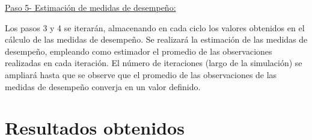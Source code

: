 \documentclass[12pt,letterpaper,spanish]{article}
\begin{document}
\begin{enumerate}
\underline{Paso 5- Estimación de medidas de desempeño:} 

Los pasos 3 y 4 se iterarán, almacenando en cada ciclo los valores obtenidos en el cálculo de las medidas de desempeño. Se realizará la estimación de las medidas de desempeño, empleando como estimador el promedio de las observaciones realizadas en cada iteración. El número de iteraciones (largo de la simulación) se ampliará hasta que se observe que el promedio de las observaciones de las medidas de desempeño converja en un valor definido. 

   
 
    
    
   

    
    
    
    

    
    
\end{enumerate}













\newpage
\section{Resultados obtenidos} %
\end{document}
